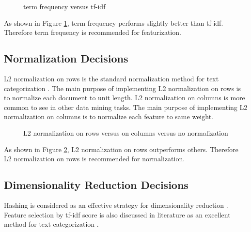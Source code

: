 \documentclass{sig-alternate-05-2015}
\begin{document}
\begin{figure}[ht]
    \centering
    \quad
    \quad
    \caption{term frequency versus tf-idf}
    \label{fig:fea}
\end{figure}

As shown in Figure \ref{fig:fea}, term frequency performs slightly better than tf-idf. Therefore term frequency is recommended for featurization.

\subsection{Normalization Decisions}

L2 normalization on rows is the standard normalization method for text categorization \cite{frank2006naive}. The main purpose of implementing L2 normalization on rows is to normalize each document to unit length. L2 normalization on columns is more common to see in other data mining tasks. The main purpose of implementing L2 normalization on columns is to normalize each feature to same weight. 

\begin{figure}[ht]
    \centering
    \quad
    \quad
    \caption{L2 normalization on rows versus on columns versus no normalization}
    \label{fig:norm}
\end{figure}

As shown in Figure \ref{fig:norm}, L2 normalization on rows outperforms others. Therefore L2 normalization on rows is recommended for normalization.

\subsection{Dimensionality Reduction Decisions}

Hashing is considered as an effective strategy for dimensionality reduction \cite{weinberger2009feature}. Feature selection by tf-idf score is also discussed in literature as an excellent method for text categorization \cite{menzies2006improving}.
\end{document}
